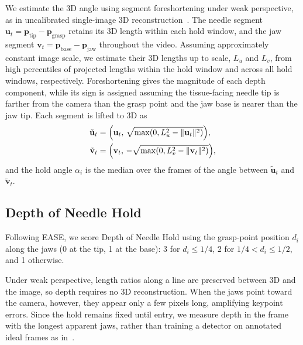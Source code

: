 We estimate the 3D angle using segment foreshortening under weak perspective,
as in uncalibrated single-image 3D reconstruction~\cite{Taylor2000}. The
needle segment
$\mathbf{u}_t=\mathbf{p}_{\mathrm{tip}}-\mathbf{p}_{\mathrm{grasp}}$ retains
its 3D length within each hold window, and the jaw segment
$\mathbf{v}_t=\mathbf{p}_{\mathrm{base}}-\mathbf{p}_{\mathrm{jaw}}$
throughout the video. Assuming approximately constant image scale, we
estimate their 3D lengths up to scale, $L_u$ and $L_v$, from high percentiles
of projected lengths within the hold window and across all hold windows,
respectively. Foreshortening gives the magnitude of each depth component,
while its sign is assigned assuming the tissue-facing needle tip is farther
from the camera than the grasp point and the jaw base is nearer than the jaw
tip. Each segment is lifted to 3D as
\begin{equation*}
\begin{aligned}
\tilde{\mathbf{u}}_t&=\Bigl(\mathbf{u}_t,\,
\sqrt{\max(0,L_u^2-\|\mathbf{u}_t\|^2)}\Bigr),\\
\tilde{\mathbf{v}}_t&=\Bigl(\mathbf{v}_t,\,
-\sqrt{\max(0,L_v^2-\|\mathbf{v}_t\|^2)}\Bigr),
\end{aligned}
\end{equation*}
and the hold angle $\alpha_i$ is the median over the frames of the angle
between $\tilde{\mathbf{u}}_t$ and $\tilde{\mathbf{v}}_t$.

\subsection{Depth of Needle Hold}
\label{ssec:depth}

Following EASE, we score Depth of Needle Hold using the
grasp-point position $d_i$ along the jaws (0 at the tip, 1 at the base): 3 for
$d_i\leq1/4$, 2 for $1/4<d_i\leq1/2$, and 1 otherwise.

Under weak perspective, length ratios along a line are preserved between 3D
and the image, so depth requires no 3D reconstruction. When the jaws point
toward the camera, however, they appear only a few pixels long, amplifying
keypoint errors. Since the hold remains fixed until entry, we measure depth in
the frame with the longest apparent jaws, rather than
training a detector on annotated ideal frames as in~\cite{Deo2026}.
